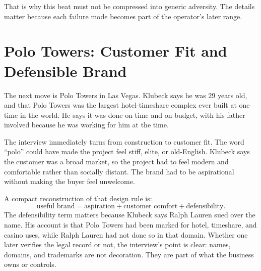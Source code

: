 That is why this beat must not be compressed into generic adversity. The details matter because each failure mode becomes part of the operator's later range.

\section{Polo Towers: Customer Fit and Defensible Brand}

The next move is Polo Towers in Las Vegas. Klubeck says he was \(29\) years old, and that Polo Towers was the largest hotel-timeshare complex ever built at one time in the world. He says it was done on time and on budget, with his father involved because he was working for him at the time.

The interview immediately turns from construction to customer fit. The word ``polo'' could have made the project feel stiff, elite, or old-English. Klubeck says the customer was a broad market, so the project had to feel modern and comfortable rather than socially distant. The brand had to be aspirational without making the buyer feel unwelcome.

A compact reconstruction of that design rule is:
\begin{equation}
\text{useful brand}
=
\text{aspiration}
+
\text{customer comfort}
+
\text{defensibility}.
\end{equation}
The defensibility term matters because Klubeck says Ralph Lauren sued over the name. His account is that Polo Towers had been marked for hotel, timeshare, and casino uses, while Ralph Lauren had not done so in that domain. Whether one later verifies the legal record or not, the interview's point is clear: names, domains, and trademarks are not decoration. They are part of what the business owns or controls.

